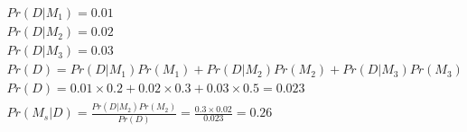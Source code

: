 \documentclass{report}
\begin{document}
\begin{description}
\begin{mdframed}
            \begin{gather}
                Pr(D | M_1) = 0.01\\
                Pr(D | M_2) = 0.02\\
                Pr(D | M_3) = 0.03\\
                Pr(D) = Pr(D|M_1)Pr(M_1) + Pr(D|M_2)Pr(M_2) + Pr(D|M_3)Pr(M_3)\\
                Pr(D) = 0.01 \times 0.2 + 0.02 \times 0.3 + 0.03 \times 0.5 = 0.023\\
                Pr(M_s | D) = \frac{Pr(D|M_2)Pr(M_2)}{Pr(D)} = \frac{0.3 \times 0.02}{0.023} = 0.26
            \end{gather}
        \end{mdframed}
\end{description}
\end{document}
